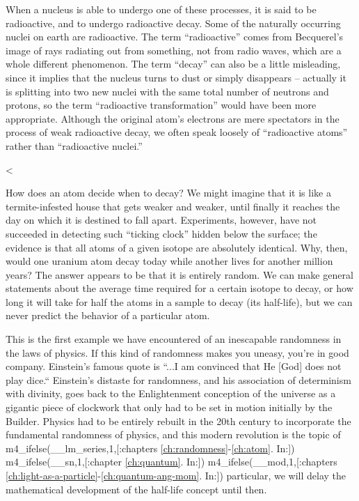         When a nucleus is able to undergo one of these processes, it
        is said to be radioactive, and to undergo radioactive decay.
        Some of the naturally occurring nuclei on earth are
        radioactive. The term ``radioactive'' comes from Becquerel's
        image of rays radiating out from something, not from radio
        waves, which are a whole different phenomenon. The term
        ``decay'' can also be a little misleading, since it implies
        that the nucleus turns to dust or simply disappears --
        actually it is splitting into two new nuclei with the
        same total number of neutrons and protons, so the term
        ``radioactive transformation'' would have been more
        appropriate. Although the original atom's electrons are mere
        spectators in the process of weak radioactive decay, we
        often speak loosely of ``radioactive atoms'' rather than
        ``radioactive nuclei.''

    <%

        How does an atom decide when to decay? We might imagine that
        it is like a termite-infested house that gets weaker and
        weaker, until finally it reaches the day on which it is
        destined to fall apart. Experiments, however, have not
        succeeded in detecting such ``ticking clock'' hidden below
        the surface; the evidence is that all atoms of a given
        isotope are absolutely identical. Why, then, would one
        uranium atom decay today while another lives for another
        million years? The answer appears to be that it is entirely
        random. We can make general statements about the average
        time required for a certain isotope to decay, or how long it
        will take for half the atoms in a sample to decay (its
        half-life), but we can never predict the behavior of a particular atom.

        This is the first example we have encountered of an
        inescapable randomness in the laws of physics. If this kind
        of randomness makes you uneasy, you're in good company. 
        Einstein's famous quote is ``...I am convinced that He [God]
        does not play dice.``  Einstein's distaste for randomness,
        and his association of determinism with divinity, goes back
        to the Enlightenment conception of the universe as a
        gigantic piece of clockwork that only had to be set in
        motion initially by the Builder. Physics had to be entirely
        rebuilt in the 20th century to incorporate the fundamental
        randomness of physics, and this modern revolution is the
        topic of %
        m4_ifelse(__lm_series,1,[:chapters \ref{ch:randomness}-\ref{ch:atom}. In:])
        m4_ifelse(__sn,1,[:chapter \ref{ch:quantum}. In:])
        m4_ifelse(__mod,1,[:chapters \ref{ch:light-as-a-particle}-\ref{ch:quantum-ang-mom}. In:])
        particular, we will delay
        the mathematical development of the half-life concept until then.

